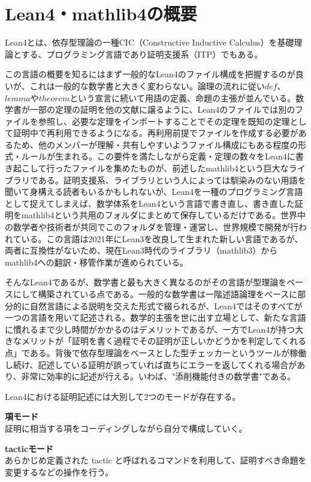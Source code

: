 \documentclass[a4paper,12pt]{bxjsbook}
\newlength{\customindent}
\newenvironment{body}{
  \par
  \begingroup
  \setlength{\leftskip}{\customindent}
  \setlength{\rightskip}{0pt}
  \setlength{\parindent}{1em}
  \setlength{\displayindent}{\customindent}
  \setlength{\displaywidth}{\dimexpr\linewidth-\customindent\relax}
}{
  \par
  \endgroup
}
\theoremstyle{theorem}
\begin{document}
    \section{Lean4・mathlib4の概要}
    \begin{body}
        \indent Lean4とは、依存型理論の一種CIC（Constructive Inductive Calculus）を基礎理論とする、プログラミング言語であり証明支援系（ITP）でもある。

        \indent この言語の概要を知るにはまず一般的なLean4のファイル構成を把握するのが良いが、これは一般的な数学書と大きく変わらない。論理の流れに従い$def$、$lemma$や$theorem$という宣言に続いて用語の定義、命題の主張が並んでいる。数学書が一部の定理の証明を他の文献に譲るように、Lean4のファイルでは別のファイルを参照し、必要な定理をインポートすることでその定理を既知の定理として証明中で再利用できるようになる。再利用前提でファイルを作成する必要があるため、他のメンバーが理解・共有しやすいようファイル構成にもある程度の形式・ルールが生まれる。この要件を満たしながら定義・定理の数々をLean4に書き起こして行ったファイルを集めたものが、前述したmathlib4という巨大なライブラリである。証明支援系、ライブラリという人によっては馴染みのない用語を聞いて身構える読者もいるかもしれないが、Lean4を一種のプログラミング言語として捉えてしまえば、数学体系をLean4という言語で書き直し、書き直した証明をmathlib4という共用のフォルダにまとめて保存しているだけである。世界中の数学者や技術者が共同でこのフォルダを管理・運営し、世界規模で開発が行われている。この言語は2021年にLean3を改良して生まれた新しい言語であるが、両者に互換性がないため、現在Lean3時代のライブラリ（mathlib3）からmathlib4への翻訳・移管作業が進められている。

        \indent そんなLean4であるが、数学書と最も大きく異なるのがその言語が型理論をベースにして構築されている点である。一般的な数学書は一階述語論理をベースに部分的に自然言語による説明を交えた形式で綴られるが、Lean4ではそのすべてが一つの言語を用いて記述される。数学的主張を世に出す立場として、新たな言語に慣れるまで少し時間がかかるのはデメリットであるが、一方でLean4が持つ大きなメリットが「証明を書く過程でその証明が正しいかどうかを判定してくれる点」である。背後で依存型理論をベースとした型チェッカーというツールが稼働し続け、記述している証明が誤っていれば直ちにエラーを返してくれる場合があり、非常に効率的に記述が行える。いわば、"添削機能付きの数学書"である。

        \indent Lean4における証明記述には大別して2つのモードが存在する。
        
        \begin{bodyitemize}[leftmargin=1.8em]
          \item[] \textbf{項モード}\\
          証明に相当する項をコーディングしながら自分で構成していく。
          \item[] \textbf{tacticモード}\\
          あらかじめ定義された tactic と呼ばれるコマンドを利用して、証明すべき命題を変更するなどの操作を行う。
        \end{bodyitemize}
        


\end{body}
\end{document}
